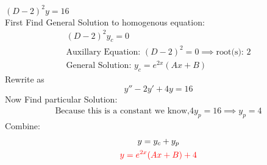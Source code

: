 \item [2.] $(D-2)^2y=16$\\[2mm]
First Find General Solution to homogenous equation:
\begin{gather*}
    (D-2)^2y_c=0\\
    \text{Auxillary Equation: }(D-2)^2=0 \implies \text{root(s): } 2\\
    \text{General Solution: } y_c=e^{2x}(Ax+B)
\end{gather*}
Rewrite as
\[
    y''-2y'+4y=16
\]
Now Find particular Solution:
\begin{gather*}
    \text{Because this is a constant we know,} 4y_p = 16
    \implies y_p = 4
\end{gather*}
Combine:
\begin{gather*}
    y=y_c+y_p\\
    \textcolor{red}{y = e^{2x}(Ax+B)+4}
\end{gather*}